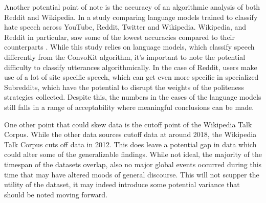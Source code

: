 \documentclass{article}
\begin{document}
Another potential point of note is the accuracy of an algorithmic analysis of both Reddit and Wikipedia. In a study comparing language models trained to classify hate speech across YouTube, Reddit, Twitter and Wikipedia. Wikipedia, and Reddit in particular, saw some of the lowest accuracies compared to their counterparts \cite[p. 21-22]{DOH}. While this study relies on language models, which classify speech differently from the ConvoKit algorithm, it's important to note the potential difficulty to classify utterances algorithmically. In the case of Reddit, users make use of a lot of site specific speech, which can get even more specific in specialized Subreddits, which have the potential to disrupt the weights of the politeness strategies collected. Despite this, the numbers in the cases of the language models still falls in a range of acceptability where meaningful conclusions can be made.

One other point that could skew data is the cutoff point of the Wikipedia Talk Corpus. While the other data sources cutoff data at around 2018, the Wikipedia Talk Corpus cuts off data in 2012. This does leave a potential gap in data which could alter some of the generalizable findings. While not ideal, the majority of the timespan of the datasets overlap, also no major global events occurred during this time that may have altered moods of general discourse. This will not scupper the utility of the dataset, it may indeed introduce some potential variance that should be noted moving forward.
\end{document}
